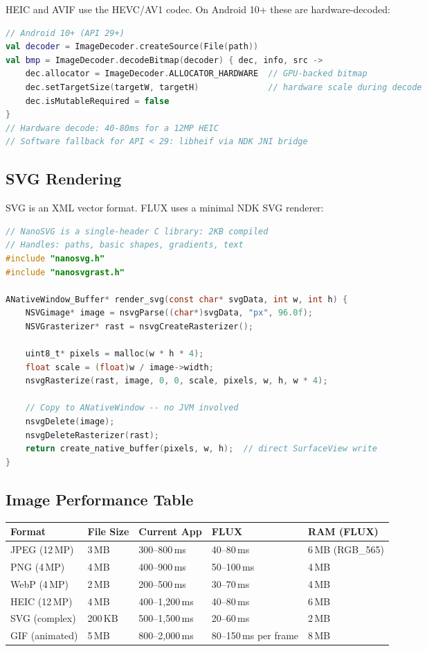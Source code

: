 \documentclass[11pt, a4paper, openright]{report}
\begin{document}
HEIC and AVIF use the HEVC/AV1 codec. On Android 10+ these are hardware-decoded:

\begin{lstlisting}[language=Kotlin, caption=Hardware HEIC Decode via ImageDecoder API]
// Android 10+ (API 29+)
val decoder = ImageDecoder.createSource(File(path))
val bmp = ImageDecoder.decodeBitmap(decoder) { dec, info, src ->
    dec.allocator = ImageDecoder.ALLOCATOR_HARDWARE  // GPU-backed bitmap
    dec.setTargetSize(targetW, targetH)              // hardware scale during decode
    dec.isMutableRequired = false
}
// Hardware decode: 40-80ms for a 12MP HEIC
// Software fallback for API < 29: libheif via NDK JNI bridge
\end{lstlisting}

\subsection{SVG Rendering}

SVG is an XML vector format. FLUX uses a minimal NDK SVG renderer:

\begin{lstlisting}[language=C, caption=svg\_render.c --- Minimal SVG via NanoSVG]
// NanoSVG is a single-header C library: 2KB compiled
// Handles: paths, basic shapes, gradients, text
#include "nanosvg.h"
#include "nanosvgrast.h"

ANativeWindow_Buffer* render_svg(const char* svgData, int w, int h) {
    NSVGimage* image = nsvgParse((char*)svgData, "px", 96.0f);
    NSVGrasterizer* rast = nsvgCreateRasterizer();

    uint8_t* pixels = malloc(w * h * 4);
    float scale = (float)w / image->width;
    nsvgRasterize(rast, image, 0, 0, scale, pixels, w, h, w * 4);

    // Copy to ANativeWindow -- no JVM involved
    nsvgDelete(image);
    nsvgDeleteRasterizer(rast);
    return create_native_buffer(pixels, w, h);  // direct SurfaceView write
}
\end{lstlisting}

\subsection{Image Performance Table}

\begin{longtable}{@{}p{30mm}p{30mm}p{30mm}p{32mm}p{28mm}@{}}
\toprule
\textbf{Format} & \textbf{File Size} & \textbf{Current App} & \textbf{FLUX} & \textbf{RAM (FLUX)} \\
\midrule
JPEG (12\,MP) & 3\,MB & 300--800\,ms & 40--80\,ms & 6\,MB (RGB\_565) \\
PNG (4\,MP) & 4\,MB & 400--900\,ms & 50--100\,ms & 4\,MB \\
WebP (4\,MP) & 2\,MB & 200--500\,ms & 30--70\,ms & 4\,MB \\
HEIC (12\,MP) & 4\,MB & 400--1,200\,ms & 40--80\,ms & 6\,MB \\
SVG (complex) & 200\,KB & 500--1,500\,ms & 20--60\,ms & 2\,MB \\
GIF (animated) & 5\,MB & 800--2,000\,ms & 80--150\,ms per frame & 8\,MB \\
\bottomrule
\end{longtable}
\end{document}
